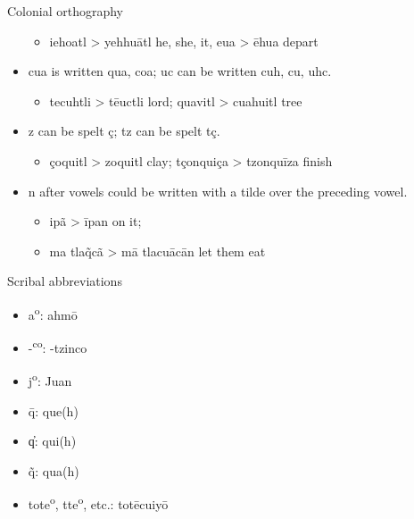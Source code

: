 \documentclass[12pt]{beamer}
\newcommand{\nah}[1]{\textcolor{nahgrn}{#1}}
\newcommand{\trs}[1]{\textcolor{nahblu}{#1}}
\begin{document}
\begin{frame}
\begin{columns}[t]
\begin{column}{.22\linewidth}
\begin{block}{Colonial orthography}
\begin{itemize}
\begin{itemize}
                  \item \nah{iehoatl} > \nah{yehhuātl} \trs{he, she, it}, \nah{eua} > \nah{ēhua} \trs{depart}
                \end{itemize}
          \item \nah{cua} is written \nah{qua, coa}; \nah{uc} can be written \nah{cuh, cu, uhc}.
                \begin{itemize}
                  \item \nah{tecuhtli} > \nah{tēuctli} \trs{lord}; \nah{quavitl} > \nah{cuahuitl} \trs{tree}
                \end{itemize}
          \item \nah{z} can be spelt \nah{ç}; \nah{tz} can be spelt \nah{tç}.
                \begin{itemize}
                  \item \nah{çoquitl} > \nah{zoquitl} \trs{clay}; \nah{tçonquiça} > \nah{tzonquīza} \trs{finish}
                \end{itemize}
          \item \nah{n} after vowels could be written with a tilde over the preceding vowel.
                \begin{itemize}
                  \item \nah{ipã} > \nah{īpan} \trs{on it};
                  \item \nah{ma tla\~qcã} > \nah{mā tlacuācān} \trs{let them eat}
                \end{itemize}
        \end{itemize}
      \end{block}
      \begin{block}{Scribal abbreviations}
        \vspace{-1.5ex}
        \begin{multicols}{2}
          \begin{itemize}
            \item \nah{a\textsuperscript{o}}: \nah{ahmō}
            \item \nah{-\textsuperscript{co}}: \nah{-tzinco}
            \item \nah{j\textsuperscript{o}}: \nah{Juan}
            \item \nah{\={q}}: \nah{que(h)}
            \item \nah{‍q̓}: \nah{qui(h)}
            \item \nah{\~{q}}: \nah{qua(h)}
            \item \nah{tote\textsuperscript{o}, tte\textsuperscript{o}}, etc.: \nah{totēcuiyō}


\end{itemize}
\end{multicols}
\end{block}
\end{column}
\end{columns}
\end{frame}
\end{document}
